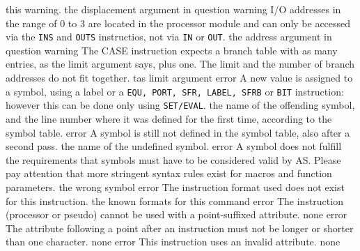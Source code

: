 \documentclass[12pt,twoside]{report}
\newcommand{\tty}[1]{{\tt #1}}
\newcommand{\asname}{{AS}}
\begin{document}
\begin{description}
{                this warning.}
               {the displacement argument in question}
               {warning}
               {I/O addresses in the range of 0 to 3 are located in the
                processor module and can only be accessed via the {\tt INS}
                and {\tt OUTS} instructios, not via {\tt IN} or {\tt OUT}.}
               {the address argument in question}
               {warning}
               {The CASE instruction expects a branch table with as many
                entries, as the limit argument says, plus one.  The limit and
                the number of branch addresses do not fit together.}
               {tas limit argument}
               {error}
               {A new value is assigned to a symbol, using a label or a
                \tty{EQU, PORT, SFR, LABEL, SFRB} or \tty{BIT} instruction: however this
                can be done only using \tty{SET/EVAL}.}
               {the name of the offending symbol, and the line number where
                it was defined for the first time, according to the symbol
                table.}
               {error}
               {A symbol is still not defined in the symbol table, also
                after a second pass.}
               {the name of the undefined symbol.}
               {error}
               {A symbol does not fulfill the requirements that symbols
                must have to be considered valid by \asname{}. Please pay
                attention that more stringent syntax rules exist for
                macros and function parameters.}
               {the wrong symbol}
               {error}
               {The instruction format used does not exist for this
                instruction.}
               {the known formats for this command}
               {error}
               {The instruction (processor or pseudo) cannot be used with a
                point-suffixed attribute.}
               {none}
               {error}
               {The attribute following a point after an instruction must
                not be longer or shorter than one character.}
               {none}
               {error}
               {This instruction uses an invalid attribute.}
               {none}

\end{description}
\end{document}
